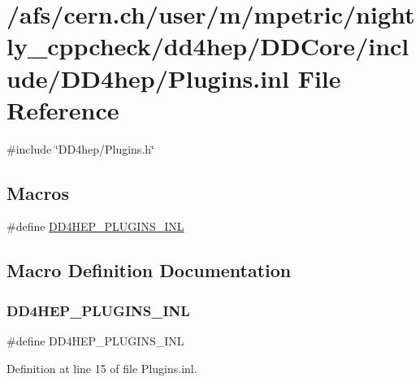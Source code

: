 \hypertarget{_plugins_8inl}{}\section{/afs/cern.ch/user/m/mpetric/nightly\+\_\+cppcheck/dd4hep/\+D\+D\+Core/include/\+D\+D4hep/\+Plugins.inl File Reference}
\label{_plugins_8inl}
{\ttfamily \#include \char`\"{}D\+D4hep/\+Plugins.\+h\char`\"{}}\newline
\subsection*{Macros}
\begin{DoxyCompactItemize}
\item 
\#define \hyperlink{_plugins_8inl_a48cad32110ee72dcbe9f1132bf5b1abf}{D\+D4\+H\+E\+P\+\_\+\+P\+L\+U\+G\+I\+N\+S\+\_\+\+I\+NL}
\end{DoxyCompactItemize}


\subsection{Macro Definition Documentation}
\hypertarget{_plugins_8inl_a48cad32110ee72dcbe9f1132bf5b1abf}{}\label{_plugins_8inl_a48cad32110ee72dcbe9f1132bf5b1abf} 
\subsubsection{\texorpdfstring{D\+D4\+H\+E\+P\+\_\+\+P\+L\+U\+G\+I\+N\+S\+\_\+\+I\+NL}{DD4HEP\_PLUGINS\_INL}}
{\footnotesize\ttfamily \#define D\+D4\+H\+E\+P\+\_\+\+P\+L\+U\+G\+I\+N\+S\+\_\+\+I\+NL}



Definition at line 15 of file Plugins.\+inl.

